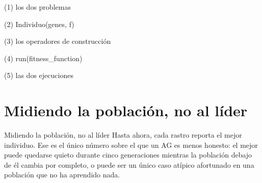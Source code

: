 \begin{frame}[fragile]{(1) los dos problemas}

\end{frame}

\begin{frame}[fragile]{(2) Individuo(genes, f)}

\end{frame}

\begin{frame}[fragile]{(3) los operadores de construcción}

\end{frame}

\begin{frame}[fragile]{(4) run(fitness\_function)}

\end{frame}

\begin{frame}[fragile]{(5) las dos ejecuciones}

\end{frame}


\section{Midiendo la población, no al líder}

\begin{frame}{Midiendo la población, no al líder}
Hasta ahora, cada rastro reporta el mejor individuo. Ese es el único número sobre
el que un AG es menos honesto: el mejor puede quedarse quieto durante cinco
generaciones mientras la población debajo de él cambia por completo, o puede ser un
único caso atípico afortunado en una población que no ha aprendido nada.
\end{frame}

